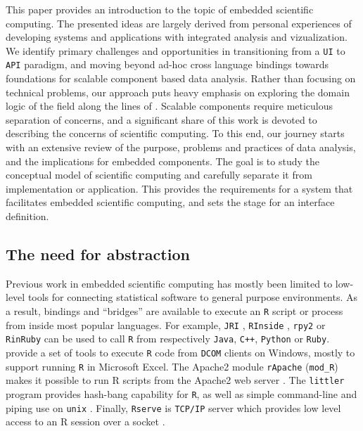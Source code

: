 \documentclass{article}
\newcommand{\R}{\texttt{R}\xspace}
\newcommand{\UI}{\texttt{UI}\xspace}
\newcommand{\API}{\texttt{API}\xspace}
\begin{document}
This paper provides an introduction to the topic of embedded scientific computing. The presented ideas are largely derived from personal experiences of developing systems and applications with integrated analysis and vizualization. We identify primary challenges and opportunities in transitioning from a \UI to \API paradigm, and moving beyond ad-hoc cross language bindings towards foundations for scalable component based data analysis. Rather than focusing on technical problems, our approach puts heavy emphasis on exploring the domain logic of the field along the lines of \citep{evans2004domain}. Scalable components require meticulous separation of concerns, and a significant share of this work is devoted to describing the concerns of scientific computing. To this end, our journey starts with an extensive review of the purpose, problems and practices of data analysis, and the implications for embedded components. The goal is to study the conceptual model of scientific computing and carefully separate it from implementation or application. This provides the requirements for a system that facilitates embedded scientific computing, and sets the stage for an interface definition.

\subsection{The need for abstraction}

Previous work in embedded scientific computing has mostly been limited to low-level tools for connecting statistical software to general purpose environments. As a result, bindings and ``bridges'' are available to execute an \R script or process from inside most popular languages. For example, \texttt{JRI} \citep{rjava}, \texttt{RInside} \citep{eddelbuettel2011rcpp}, \texttt{rpy2} \citep{gautier2008rpy2} or \texttt{RinRuby} \citep{dahl2008rinruby} can be used to call \R from respectively \texttt{Java}, \texttt{C++}, \texttt{Python} or \texttt{Ruby}. \cite{heiberger2009r} provide a set of tools to execute \R code from \texttt{DCOM} clients on Windows, mostly to support running \R in Microsoft Excel. The Apache2 module \texttt{rApache} (\texttt{mod\_R}) makes it possible to run R scripts from the Apache2 web server \citep{horner2013rapache}. The \texttt{littler} program provides hash-bang capability for \R, as well as simple command-line and piping use on \texttt{unix} \citep{littler}. Finally, \texttt{Rserve} is \texttt{TCP/IP} server which provides low level access to an R session over a socket \citep{urbanek2013rserve}. 
\end{document}
